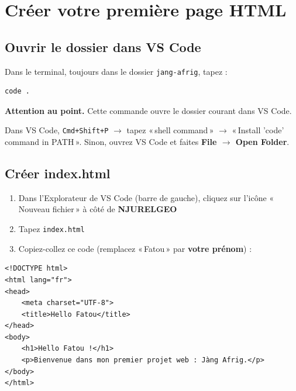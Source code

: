 \documentclass[11pt,a4paper]{article}
\begin{document}
\newpage

\section{Créer votre première page HTML}

\subsection{Ouvrir le dossier dans VS Code}

Dans le terminal, toujours dans le dossier \texttt{jang-afrig}, tapez :

\begin{lstlisting}
code .
\end{lstlisting}

\textbf{Attention au point.} Cette commande ouvre le dossier courant dans
VS Code.

\begin{infobox}
Dans VS Code, \texttt{Cmd+Shift+P} $\to$ tapez «\,shell command\,» $\to$
«\,Install 'code' command in PATH\,». Sinon, ouvrez VS Code et faites
\textbf{File $\to$ Open Folder}.
\end{infobox}

\subsection{Créer index.html}

\begin{enumerate}[nosep]
    \item Dans l'Explorateur de VS Code (barre de gauche), cliquez sur l'icône «\,Nouveau fichier\,» à côté de \textbf{NJURELGEO}
    \item Tapez \texttt{index.html}
    \item Copiez-collez ce code (remplacez «\,Fatou\,» par \textbf{votre prénom}) :
\end{enumerate}

\begin{lstlisting}
<!DOCTYPE html>
<html lang="fr">
<head>
    <meta charset="UTF-8">
    <title>Hello Fatou</title>
</head>
<body>
    <h1>Hello Fatou !</h1>
    <p>Bienvenue dans mon premier projet web : Jàng Afrig.</p>
</body>
</html>
\end{lstlisting}
\end{document}
